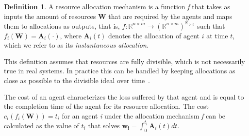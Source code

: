 \documentclass[letterpaper]{article} %
\theoremstyle{definition}
\newtheorem{definition}{Definition}
\begin{document}
\begin{definition}
A resource allocation mechanism is a function \textit{f} that takes as inputs the amount of resources $\mathbf{W}$ that are required by the agents and maps them to allocations as outputs, that is, $f : \mathbb{R}^{n \times m} \rightarrow (\mathbb{R}^{n \times m})^{\mathbb{R}_{\geq 0}} $ such that $f_{i}(\mathbf{W}) = \mathbf{A}_{i}(\cdot)$, where $\mathbf{A}_{i}(t)$ denotes the allocation of agent $i$ at time $t$, which we refer to as its {\em instantaneous allocation}.
\end{definition}

This definition assumes that resources are fully divisible, which is not necessarily true in real systems.  In practice this can be handled by keeping allocations as close as possible to the divisible ideal over time~\cite{Hindman2011Mesos}.

The cost of an agent characterizes the loss suffered by that agent and is equal to the completion time of the agent for its resource allocation. The cost $c_{i}(f_{i}(\mathbf{W})) = t_{i}$ for an agent \textit{i} under the allocation mechanism \textit{f} can be calculated as the value of $t_i$ that solves $ \mathbf{w_{i}} = \displaystyle \int_{0}^{t_{i}}\mathbf{A}_{i}(t)dt$. 
\end{document}

